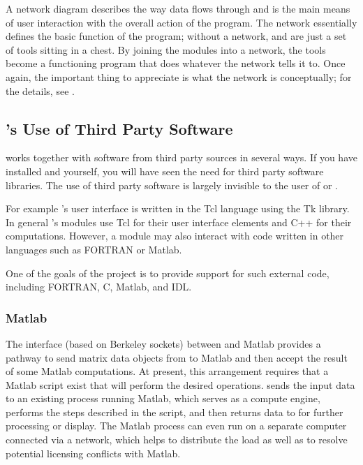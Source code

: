 A network diagram  describes the way data flows
through \SR{} and is the main means of user interaction with the overall
action of the program.  The network essentially defines the basic function of
the program; without a network, \SR{} and \BIOPSE{} are just a set of tools
sitting in a chest.  By joining the modules into a network, the tools
become a functioning program that does whatever the network tells it to.
Once again, the important thing to appreciate is what the network is
conceptually; for the details, see . 


\subsection{\sr{}'s Use of Third Party Software}
\label{sec:con-links} 

\SR{} works together with software from third party sources in several
ways.  If you have installed \SR{} and \BIOPSE{} yourself, you will
have seen the need for third party software libraries.  The use of
third party software is largely invisible to the user of \SR{} or
\BIOPSE{}.

For example \sr{}'s user interface is written in the Tcl language
using the Tk library.  In general \sr{}'s modules use Tcl for their
user interface elements and C++ for their computations.  However, a
module may also interact with code written in other languages such as
FORTRAN or Matlab.

One of the goals of the \BIOPSE{} project is to provide
support for such external code, including FORTRAN, C, Matlab, and
IDL\@.

\subsubsection{Matlab}
\label{sec:concept-matlab} 

The interface (based on Berkeley sockets) between \SR{} and Matlab provides
a pathway to send matrix data objects from \SR{} to Matlab and then accept
the result of some Matlab computations.  At present, this arrangement
requires that a Matlab script exist that will perform the desired
operations.  \SR{} sends the input data to an existing process running
Matlab, which serves as a compute engine, performs the steps
described in the script, and then returns data to \SR{} for further
processing or display.  The Matlab process can even run on a separate
computer connected via a network, which helps to distribute the load as
well as to resolve potential licensing conflicts with Matlab.

